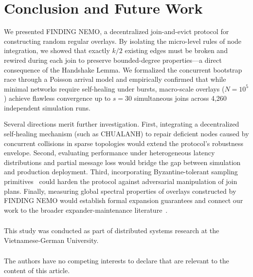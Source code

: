 \documentclass[runningheads]{llncs}
\begin{document}
\section{Conclusion and Future Work}

We presented FINDING NEMO, a decentralized join-and-evict protocol for constructing random regular overlays. By isolating the micro-level rules of node integration, we showed that exactly $k/2$ existing edges must be broken and rewired during each join to preserve bounded-degree properties---a direct consequence of the Handshake Lemma. We formalized the concurrent bootstrap race through a Poisson arrival model and empirically confirmed that while minimal networks require self-healing under bursts, macro-scale overlays ($N = 10^5$) achieve flawless convergence up to $s = 30$ simultaneous joins across 4{,}260 independent simulation runs.

Several directions merit further investigation. First, integrating a decentralized self-healing mechanism (such as CHUALANH) to repair deficient nodes caused by concurrent collisions in sparse topologies would extend the protocol's robustness envelope. Second, evaluating performance under heterogeneous latency distributions and partial message loss would bridge the gap between simulation and production deployment. Third, incorporating Byzantine-tolerant sampling primitives~\cite{zhangHoneybeeByzantineTolerant2025,mukamAUPECollaborativeByzantine} could harden the protocol against adversarial manipulation of join plans. Finally, measuring global spectral properties of overlays constructed by FINDING NEMO would establish formal expansion guarantees and connect our work to the broader expander-maintenance literature~\cite{crucianiMaintainingBoundedDegree2025,angileriThresholdDrivenStreamingGraph2025}.

%



\begin{credits}
\subsubsection{\ackname}
This study was conducted as part of distributed systems research at the Vietnamese-German University.

\subsubsection{\discintname}
The authors have no competing interests to declare that are relevant to the content of this article.
\end{credits}
\end{document}
